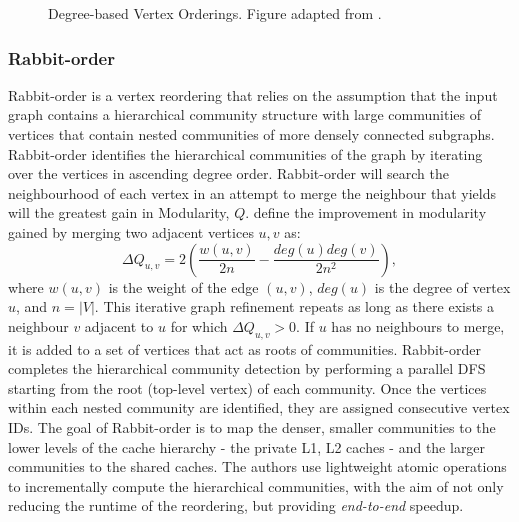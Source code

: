 

\begin{figure}[!htb]
    \begin{adjustwidth}{-0.75in}{-0.75in}
        \centering
        
        \caption{
            Degree-based Vertex Orderings. Figure adapted from \cite{lwr}.
        }
        \label{fig:degree_based_vertex_orderings}   %
    \end{adjustwidth}
\end{figure}


\subsubsection{Rabbit-order}
Rabbit-order is a vertex reordering that relies on the assumption that the input graph contains a hierarchical community structure with large communities of vertices that contain nested communities of more densely connected subgraphs.  Rabbit-order identifies the hierarchical communities of the graph by iterating over the vertices in ascending degree order. Rabbit-order will search the neighbourhood of each vertex in an attempt to merge the neighbour that yields will the greatest gain in Modularity, $Q$. \citet{rabbit} define the improvement in modularity gained by merging two adjacent vertices $u,v$ as: 
\[\Delta Q_{u, v} = 2 \left(\frac{w(u, v)}{2n} - \frac{deg(u)deg(v)}{2n^2}\right),\]
where $w(u,v)$ is the weight of the edge $(u, v)$, $deg(u)$ is the degree of vertex $u$, and $n = |V|$.
This iterative graph refinement repeats as long as there exists a neighbour $v$ adjacent to $u$ for which 
$\Delta Q_{u, v} > 0$.
If $u$ has no neighbours to merge, it is added to a set of vertices that act as roots of communities. 
Rabbit-order completes the hierarchical community detection by performing a parallel \ac{DFS} starting from the root (top-level vertex) of each community. Once the vertices within each nested community are identified, they are assigned consecutive vertex IDs. 
The goal of Rabbit-order is to map the denser, smaller communities to the lower levels of the cache hierarchy - the private L1, L2 caches - and the larger communities to the shared caches. The authors use lightweight atomic operations to incrementally compute the hierarchical communities, with the aim of not only reducing the runtime of the reordering, but providing \textit{end-to-end} speedup. 
